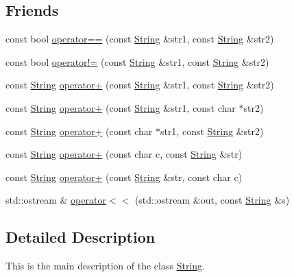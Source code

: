 \subsection*{Friends}
\begin{DoxyCompactItemize}
\item 
const bool \hyperlink{classprism_1_1_string_a42ce36244ff044035bee8e0e1d764aa1}{operator==} (const \hyperlink{classprism_1_1_string}{String} \&str1, const \hyperlink{classprism_1_1_string}{String} \&str2)
\item 
const bool \hyperlink{classprism_1_1_string_a5ae2214b74e00980046a6b8bc25c5e7b}{operator!=} (const \hyperlink{classprism_1_1_string}{String} \&str1, const \hyperlink{classprism_1_1_string}{String} \&str2)
\item 
const \hyperlink{classprism_1_1_string}{String} \hyperlink{classprism_1_1_string_a075cd9151fd072beb0e0cd6818705282}{operator+} (const \hyperlink{classprism_1_1_string}{String} \&str1, const \hyperlink{classprism_1_1_string}{String} \&str2)
\item 
const \hyperlink{classprism_1_1_string}{String} \hyperlink{classprism_1_1_string_a5fa6807d2f989f96e6627f1491b3a17d}{operator+} (const \hyperlink{classprism_1_1_string}{String} \&str1, const char $\ast$str2)
\item 
const \hyperlink{classprism_1_1_string}{String} \hyperlink{classprism_1_1_string_a5c796b848ad804a70790ca1bb06eae98}{operator+} (const char $\ast$str1, const \hyperlink{classprism_1_1_string}{String} \&str2)
\item 
const \hyperlink{classprism_1_1_string}{String} \hyperlink{classprism_1_1_string_a862eb7ba30f61463cb3b23470bbb4aac}{operator+} (const char c, const \hyperlink{classprism_1_1_string}{String} \&str)
\item 
const \hyperlink{classprism_1_1_string}{String} \hyperlink{classprism_1_1_string_a95840fe41f8c1dbc819e3215ac6eb616}{operator+} (const \hyperlink{classprism_1_1_string}{String} \&str, const char c)
\item 
std\+::ostream \& \hyperlink{classprism_1_1_string_a22f0a77d546199afaac3503fc9b9ef51}{operator$<$$<$} (std\+::ostream \&out, const \hyperlink{classprism_1_1_string}{String} \&s)
\end{DoxyCompactItemize}


\subsection{Detailed Description}
This is the main description of the class \hyperlink{classprism_1_1_string}{String}. 

